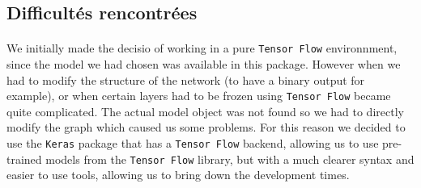 \documentclass[11 pt]{article}
\begin{document}
\subsection{Difficultés rencontrées}
\paragraph{} We initially made the decisio of working in a pure \texttt{Tensor Flow} environnment, since the model we had chosen was available in this package. However when we had to modify the structure of the network (to have a binary output for example), or when certain layers had to be frozen using \texttt{Tensor Flow} became quite complicated. The actual model object was not found so we had to directly modify the graph which caused us some problems. For this reason we decided to use the \texttt{Keras} package that has a \texttt{Tensor Flow} backend, allowing us to use pre-trained models from the \texttt{Tensor Flow} library, but with a much clearer syntax and easier to use tools, allowing us to bring down the development times. 

\end{document}
